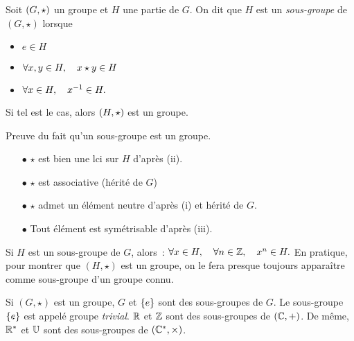 \documentclass{magnolia}
\begin{document}
\begin{definition}
Soit $\left(G,\star\right)$ un groupe et $H$ une partie de $G$. On dit que $H$ est un
\emph{sous-groupe} de $(G,\star)$ lorsque
\begin{itemize}
\item $e\in H$
\item $\forall x,y\in H ,\quad x\star y\in H$
\item $\forall x\in H ,\quad x^{-1}\in H.$
\end{itemize}
Si tel est le cas, alors $\left(H,\star\right)$ est un groupe.
\end{definition}

\begin{preuve}
Preuve du fait qu'un sous-groupe est un groupe.
\begin{itemize}
\item[$\bullet$]$\star$ est bien une lci sur $H$ d'après (ii).
\item[$\bullet$]$\star$ est associative (hérité de $G$)
\item[$\bullet$]$\star$ admet un élément neutre d'après (i) et hérité de $G$.
\item[$\bullet$] Tout élément est symétrisable d'après (iii).
\end{itemize}
\end{preuve}

\begin{remarques}
\remarque Si $H$ est un sous-groupe de $G$, alors~:
  $\forall x\in H,\quad \forall n\in\mathbb{Z} ,\quad x^n\in H.$
\remarque En pratique, pour montrer que $(H,\star)$ est un groupe, on le fera
  presque toujours apparaître comme sous-groupe d'un groupe connu.
\end{remarques}

\begin{exemples}
\exemple Si $(G,\star)$ est un groupe, $G$ et $\left\{e\right\}$ sont des sous-groupes
  de $G$. Le sous-groupe $\left\{e\right\}$ est appelé groupe \emph{trivial}.
\exemple $\mathbb{R}$ et $\mathbb{Z}$ sont des sous-groupes de $(\mathbb{C},+)$.
  De même, ${\mathbb{R}^*}$ et $\U$ sont des sous-groupes de $(\mathbb{C}^*,\times)$.
\end{exemples}
\end{document}
